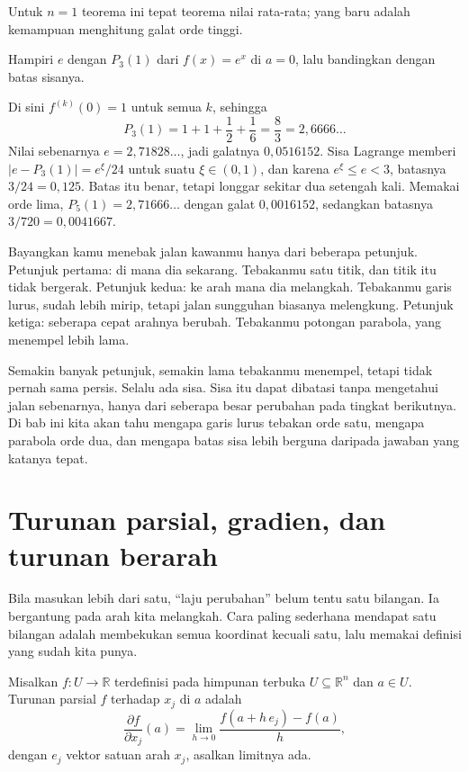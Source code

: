 Untuk $n=1$ teorema ini tepat teorema nilai rata-rata; yang baru adalah kemampuan menghitung
galat orde tinggi.

\begin{contoh}
Hampiri $e$ dengan $P_{3}(1)$ dari $f(x)=e^{x}$ di $a=0$, lalu bandingkan dengan batas
sisanya.
\end{contoh}

Di sini $f^{(k)}(0)=1$ untuk semua $k$, sehingga
\[
  P_{3}(1)=1+1+\frac{1}{2}+\frac{1}{6}=\frac{8}{3}=2{,}6666\ldots
\]
Nilai sebenarnya $e=2{,}71828\ldots$, jadi galatnya $0{,}0516152$. Sisa Lagrange memberi
$|e-P_{3}(1)|=e^{\xi}/24$ untuk suatu $\xi\in(0,1)$, dan karena $e^{\xi}\le e<3$, batasnya
$3/24=0{,}125$. Batas itu benar, tetapi longgar sekitar dua setengah kali. Memakai orde
lima, $P_{5}(1)=2{,}71666\ldots$ dengan galat $0{,}0016152$, sedangkan batasnya
$3/720=0{,}0041667$.

\begin{untukanak}
Bayangkan kamu menebak jalan kawanmu hanya dari beberapa petunjuk. Petunjuk pertama: di mana
dia sekarang. Tebakanmu satu titik, dan titik itu tidak bergerak. Petunjuk kedua: ke arah mana
dia melangkah. Tebakanmu garis lurus, sudah lebih mirip, tetapi jalan sungguhan biasanya
melengkung. Petunjuk ketiga: seberapa cepat arahnya berubah. Tebakanmu potongan parabola, yang
menempel lebih lama.

Semakin banyak petunjuk, semakin lama tebakanmu menempel, tetapi tidak pernah sama persis.
Selalu ada sisa. Sisa itu dapat dibatasi tanpa mengetahui jalan sebenarnya, hanya dari
seberapa besar perubahan pada tingkat berikutnya. Di bab ini kita akan tahu mengapa garis
lurus tebakan orde satu, mengapa parabola orde dua, dan mengapa batas sisa lebih berguna
daripada jawaban yang katanya tepat.
\end{untukanak}

\section{Turunan parsial, gradien, dan turunan berarah}

Bila masukan lebih dari satu, ``laju perubahan'' belum tentu satu bilangan. Ia bergantung
pada arah kita melangkah. Cara paling sederhana mendapat satu bilangan adalah membekukan
semua koordinat kecuali satu, lalu memakai definisi yang sudah kita punya.

\begin{definisi}
Misalkan $f\colon U\to\mathbb{R}$ terdefinisi pada himpunan terbuka
$U\subseteq\mathbb{R}^{n}$ dan $a\in U$. Turunan parsial $f$ terhadap $x_{j}$ di $a$ adalah
\[
  \frac{\partial f}{\partial x_{j}}(a)
  =\lim_{h\to0}\frac{f(a+h\,e_{j})-f(a)}{h},
\]
dengan $e_{j}$ vektor satuan arah $x_{j}$, asalkan limitnya ada.
\end{definisi}

